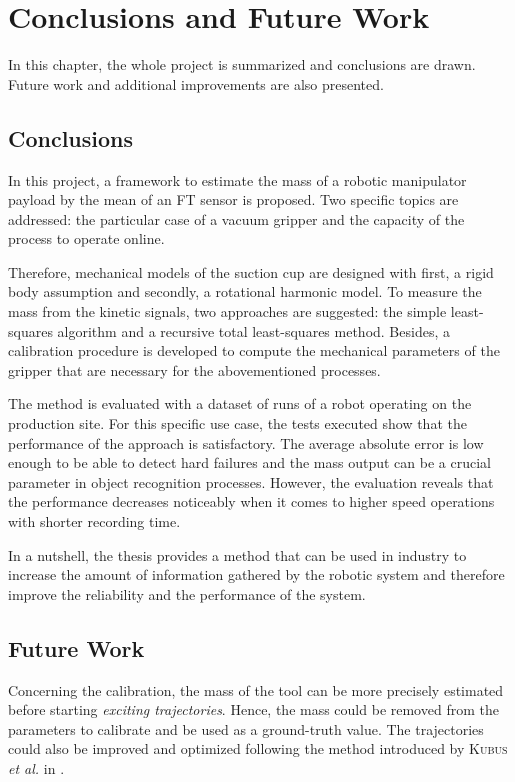 \documentclass[/home/francois/latex/report/main.tex]{subfiles}
\begin{document}
\chapter{Conclusions and Future Work}
\label{chapter:conclusions}

In this chapter, the whole project is summarized and conclusions are drawn. Future work and additional improvements are also presented.

\section{Conclusions}

In this project, a framework to estimate the mass of a robotic manipulator payload by the mean of an \ac{FT} sensor is proposed. Two specific topics are addressed: the particular case of a vacuum gripper and the capacity of the process to operate online.

Therefore, mechanical models of the suction cup are designed with first, a rigid body assumption and secondly, a rotational harmonic model. To measure the mass from the kinetic signals, two approaches are suggested: the simple least-squares algorithm and a recursive total least-squares method. Besides, a calibration procedure is developed to compute the mechanical parameters of the gripper that are necessary for the abovementioned processes.

The method is evaluated with a dataset of runs of a robot operating on the production site. For this specific use case, the tests executed show that the performance of the approach is satisfactory. The average absolute error is low enough to be able to detect hard failures and the mass output can be a crucial parameter in object recognition processes. However, the evaluation reveals that the performance decreases noticeably when it comes to higher speed operations with shorter recording time.

In a nutshell, the thesis provides a method that can be used in industry to increase the amount of information gathered by the robotic system and therefore improve the reliability and the performance of the system.

\section{Future Work}

Concerning the calibration, the mass of the tool can be more precisely estimated before starting \textit{exciting trajectories}. Hence, the mass could be removed from the parameters to calibrate and be used as a ground-truth value. The trajectories could also be improved and optimized following the method introduced by \textsc{Kubus} \textit{et al.} in \cite{Kubus2008}.
\end{document}
